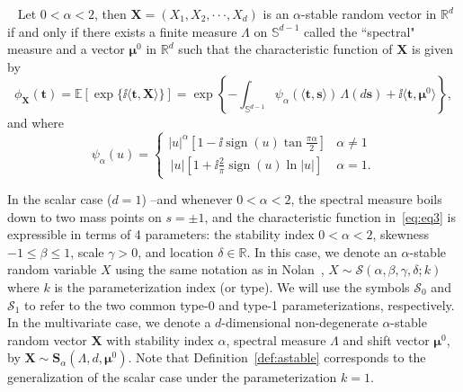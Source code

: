  \begin{definition}~\citep{SamorodnitskyGennady2000Snrp}
 \label{def:astable}
 Let $0<\alpha<2$, then $\mathbf{X}=(X_1,X_2,\cdot\cdot\cdot,X_d)$ is an $\alpha$-stable random vector in $\mathbb{R}^d$ if and only if there exists a finite measure \(\Lambda\) on $\mathbb{S}^{d-1}$ called the ``spectral" measure and a vector \(\boldsymbol{\mu}^{0}\) in $\mathbb{R}^d$ such that the characteristic function of $\mathbf{X}$ is given by
 \begin{equation}\label{eq:eq3}
    \phi_{\mathbf{X}}(\mathbf{t}) = \mathbb{E} \left[ \exp\{\ii ⟨ \mathbf{t},\mathbf{X}⟩\} \right]= \exp\left\{-\int_{\mathbb{S}^{d-1}} \psi_\alpha(⟨ \mathbf{t}, \mathbf{s} ⟩) \, \Lambda(d\mathbf{s}) + \ii ⟨ \mathbf{t},\boldsymbol{\mu}^0 ⟩\right\},
  \end{equation}
    and where \begin{equation*}
    \psi_\alpha(u) =
\begin{cases}
\displaystyle |u|^\alpha \left[ 1 - \ii \operatorname{sign}(u) \tan \frac{\pi \alpha}{2} \right] & \alpha \ne 1 \\
\displaystyle \, |u| \left[ 1 + \ii \frac{2}{\pi} \operatorname{sign}(u) \ln |u| \right] & \alpha = 1.
\end{cases}
\end{equation*}
\end{definition}

In the scalar case ($d = 1$) --and whenever $0<\alpha<2$, the spectral measure boils down to two mass points on $s = \pm 1$, and the characteristic function in~\eqref{eq:eq3} is expressible in terms of 4 parameters: the stability index $0<\alpha<2$, skewness $-1\leq\beta\leq1$, scale $\gamma>0$, and location $\delta\in\mathbb{R}$. In this case, we denote an \(\alpha\)-stable random variable $X$ using the same notation as in Nolan~\citep{NolanJohnP2020USDM}, \(X\!\sim\!\mathcal{S}(\alpha,\beta,\gamma,\delta;k)\) where $k$ is the parameterization index (or type). We will use the symbols $\mathcal{S}_0$ and $\mathcal{S}_1$ to refer to the two common type-0 and type-1 parameterizations, respectively. In the multivariate case, we denote a $d$-dimensional non-degenerate $\alpha$-stable random vector \(\mathbf{X}\) with stability index $\alpha$, spectral measure $\Lambda$ and shift vector $\boldsymbol{\mu}^0$, by $\mathbf{X}\sim\mathbf{S}_\alpha(\Lambda,d,\boldsymbol{\mu}^0)$. Note that Definition~\ref{def:astable} corresponds to the generalization of the scalar case under the parameterization $k=1$.

